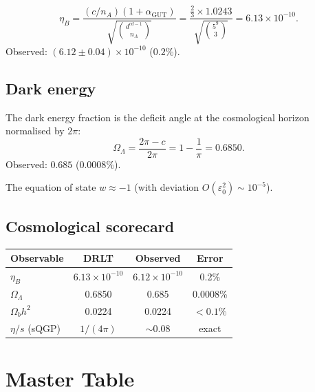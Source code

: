 \documentclass[12pt]{article}
\theoremstyle{definition}
\theoremstyle{remark}
\newcommand{\agut}{\alpha_{\mathrm{GUT}}}
\begin{document}
\begin{equation}
\eta_B
= \frac{(c/n_A)(1 + \agut)}
  {\sqrt{\binom{d^{cd-1}}{n_A}}}
= \frac{\frac{2}{3} \times 1.0243}
  {\sqrt{\binom{5^9}{3}}}
= 6.13 \times 10^{-10}.
\end{equation}
Observed: $(6.12 \pm 0.04) \times 10^{-10}$
($0.2\%$).

\subsection{Dark energy}

The dark energy fraction is the
deficit angle at the cosmological horizon
normalised by $2\pi$:
\begin{equation}
\Omega_\Lambda
= \frac{2\pi - c}{2\pi}
= 1 - \frac{1}{\pi}
= 0.6850.
\end{equation}
Observed: $0.685$ ($0.0008\%$).

The equation of state $w \approx -1$
(with deviation $O(\varepsilon_0^2) \sim 10^{-5}$).

\subsection{Cosmological scorecard}

\begin{center}
\begin{tabular}{lccc}
\toprule
Observable & DRLT & Observed & Error \\
\midrule
$\eta_B$ & $6.13 \times 10^{-10}$
  & $6.12 \times 10^{-10}$ & 0.2\% \\
$\Omega_\Lambda$ & 0.6850 & 0.685 & 0.0008\% \\
$\Omega_b h^2$ & 0.0224 & 0.0224 & $<0.1\%$ \\
$\eta/s$ (sQGP) & $1/(4\pi)$ & $\sim 0.08$
  & exact \\
\bottomrule
\end{tabular}
\end{center}

\section{Master Table}
\label{sec:master}
\end{document}
